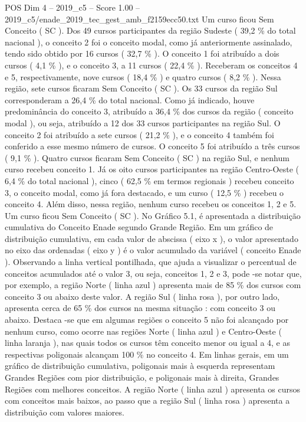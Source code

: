 \begin{textsample}{POS Dim 4 – 2019\_c5 – Score 1.00 – 2019\_c5/enade\_2019\_tec\_gest\_amb\_f2159ecc50.txt}
Um curso ficou Sem Conceito ( SC ).
Dos 49 cursos participantes da região Sudeste ( 39,2 \% do total nacional ), o conceito 2 foi o conceito modal, como já anteriormente assinalado, tendo sido obtido por 16 cursos ( 32,7 \% ).
O conceito 1 foi atribuído a dois cursos ( 4,1 \% ), e o conceito 3, a 11 cursos ( 22,4 \% ).
Receberam os conceitos 4 e 5, respectivamente, nove cursos ( 18,4 \% ) e quatro cursos ( 8,2 \% ).
Nessa região, sete cursos ficaram Sem Conceito ( SC ).
Os 33 cursos da região Sul corresponderam a 26,4 \% do total nacional.
Como já indicado, houve predominância do conceito 3, atribuído a 36,4 \% dos cursos da região ( conceito modal ), ou seja, atribuído a 12 dos 33 cursos participantes na região Sul.
O conceito 2 foi atribuído a sete cursos ( 21,2 \% ), e o conceito 4 também foi conferido a esse mesmo número de cursos.
O conceito 5 foi atribuído a três cursos ( 9,1 \% ).
Quatro cursos ficaram Sem Conceito ( SC ) na região Sul, e nenhum curso recebeu conceito 1.
Já os oito cursos participantes na região Centro-Oeste ( 6,4 \% do total nacional ), cinco ( 62,5 \% em termos regionais ) recebeu conceito 3, o conceito modal, como já fora destacado, e um curso ( 12,5 \% ) recebeu o conceito 4.
Além disso, nessa região, nenhum curso recebeu os conceitos 1, 2 e 5.
Um curso ficou Sem Conceito ( SC ).
No Gráfico 5.1, é apresentada a distribuição cumulativa do Conceito Enade segundo Grande Região.
Em um gráfico de distribuição cumulativa, em cada valor de abscissa ( eixo x ), o valor apresentado no eixo das ordenadas ( eixo y ) é o valor acumulado da variável ( conceito Enade ).
Observando a linha vertical pontilhada, que ajuda a visualizar o percentual de conceitos acumulados até o valor 3, ou seja, conceitos 1, 2 e 3, pode -se notar que, por exemplo, a região Norte ( linha azul ) apresenta mais de 85 \% dos cursos com conceito 3 ou abaixo deste valor.
A região Sul ( linha rosa ), por outro lado, apresenta cerca de 65 \% dos cursos na mesma situação : com conceito 3 ou abaixo.
Destaca -se que em algumas regiões o conceito 5 não foi alcançado por nenhum curso, como ocorre nas regiões Norte ( linha azul ) e Centro-Oeste ( linha laranja ), nas quais todos os cursos têm conceito menor ou igual a 4, e as respectivas poligonais alcançam 100 \% no conceito 4.
Em linhas gerais, em um gráfico de distribuição cumulativa, poligonais mais à esquerda representam Grandes Regiões com pior distribuição, e poligonais mais à direita, Grandes Regiões com melhores conceitos.
A região Norte ( linha azul ) apresenta os cursos com conceitos mais baixos, ao passo que a região Sul ( linha rosa ) apresenta a distribuição com valores maiores.

\end{textsample}
